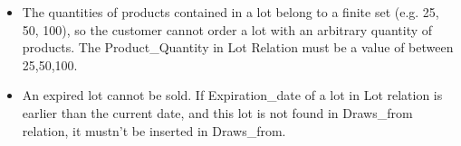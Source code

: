 \begin{itemize}
\item The quantities of products contained in a lot belong to a finite set (e.g. 25, 50, 100), so the customer cannot order a lot with an arbitrary quantity of products. The Product\_Quantity in Lot Relation must be a value of between 25,50,100.
\item An expired lot cannot be sold. If Expiration\_date of a lot in  Lot relation is earlier than the current date, and this lot is not found in Draws\_from relation, it mustn't be  inserted in Draws\_from.
\end{itemize}